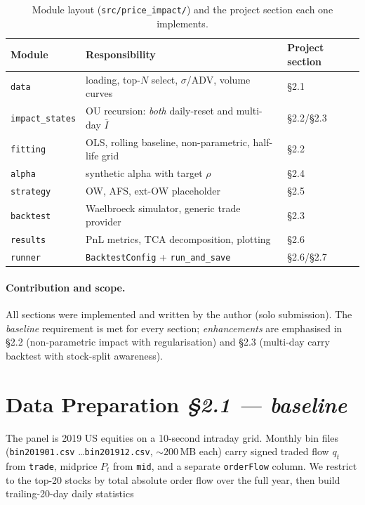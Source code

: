 \documentclass[11pt,a4paper]{article}
\begin{document}
\begin{table}[H]
\centering\small
\caption{Module layout (\texttt{src/price\_impact/}) and the project
         section each one implements.}
\begin{tabular}{lll}
\toprule
Module & Responsibility & Project section \\
\midrule
\texttt{data}          & loading, top-$N$ select, $\sigma$/ADV, volume curves & \S2.1 \\
\texttt{impact\_states}& OU recursion: \emph{both} daily-reset and multi-day $\bar I$ & \S2.2/\S2.3 \\
\texttt{fitting}       & OLS, rolling baseline, non-parametric, half-life grid & \S2.2 \\
\texttt{alpha}         & synthetic alpha with target $\rho$ & \S2.4 \\
\texttt{strategy}      & OW, AFS, ext-OW placeholder & \S2.5 \\
\texttt{backtest}      & Waelbroeck simulator, generic trade provider & \S2.3 \\
\texttt{results}       & PnL metrics, TCA decomposition, plotting & \S2.6 \\
\texttt{runner}        & \texttt{BacktestConfig} + \texttt{run\_and\_save} & \S2.6/\S2.7 \\
\bottomrule
\end{tabular}
\end{table}

\paragraph{Contribution and scope.}  All sections were implemented and
written by the author (solo submission).  The \emph{baseline} requirement
is met for every section; \emph{enhancements} are emphasised in \S2.2
(non-parametric impact with regularisation) and \S2.3 (multi-day carry
backtest with stock-split awareness).

\section{Data Preparation \hfill \normalsize\itshape \S2.1 --- baseline}

The panel is 2019 US equities on a 10-second intraday grid.  Monthly bin
files (\texttt{bin201901.csv} \ldots \texttt{bin201912.csv}, ${\sim}200$\,MB each)
carry signed traded flow $q_t$ from \texttt{trade}, midprice $P_t$ from
\texttt{mid}, and a separate \texttt{orderFlow} column.  We restrict to the
top-20 stocks by total absolute order flow over the full year, then build
trailing-20-day daily statistics
\end{document}
